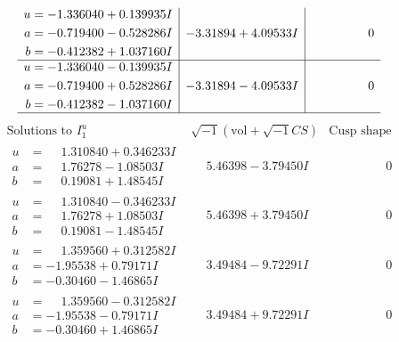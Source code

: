 \documentclass[1p]{elsarticle_modified}
\theoremstyle{definition}
\newcommand{\I}{\sqrt{-1}}
\begin{document}
$$\begin{array}{c|c|c}
\begin{aligned}
u &= -1.336040 + 0.139935 I \\
a &= -0.719400 - 0.528286 I \\
b &= -0.412382 + 1.037160 I\end{aligned}
 & -3.31894 + 4.09533 I & \phantom{-0.000000 } 0 \\ \hline\begin{aligned}
u &= -1.336040 - 0.139935 I \\
a &= -0.719400 + 0.528286 I \\
b &= -0.412382 - 1.037160 I\end{aligned}
 & -3.31894 - 4.09533 I & \phantom{-0.000000 } 0\\
 \hline 
 \end{array}$$\newpage$$\begin{array}{c|c|c}  
\text{Solutions to }I^u_{1}& \I (\text{vol} + \sqrt{-1}CS) & \text{Cusp shape}\\
 \hline 
\begin{aligned}
u &= \phantom{-}1.310840 + 0.346233 I \\
a &= \phantom{-}1.76278 - 1.08503 I \\
b &= \phantom{-}0.19081 + 1.48545 I\end{aligned}
 & \phantom{-}5.46398 - 3.79450 I & \phantom{-0.000000 } 0 \\ \hline\begin{aligned}
u &= \phantom{-}1.310840 - 0.346233 I \\
a &= \phantom{-}1.76278 + 1.08503 I \\
b &= \phantom{-}0.19081 - 1.48545 I\end{aligned}
 & \phantom{-}5.46398 + 3.79450 I & \phantom{-0.000000 } 0 \\ \hline\begin{aligned}
u &= \phantom{-}1.359560 + 0.312582 I \\
a &= -1.95538 + 0.79171 I \\
b &= -0.30460 - 1.46865 I\end{aligned}
 & \phantom{-}3.49484 - 9.72291 I & \phantom{-0.000000 } 0 \\ \hline\begin{aligned}
u &= \phantom{-}1.359560 - 0.312582 I \\
a &= -1.95538 - 0.79171 I \\
b &= -0.30460 + 1.46865 I\end{aligned}
 & \phantom{-}3.49484 + 9.72291 I & \phantom{-0.000000 } 0 \\ \hline\begin{aligned}

\end{aligned}
\end{array}$$
\end{document}
